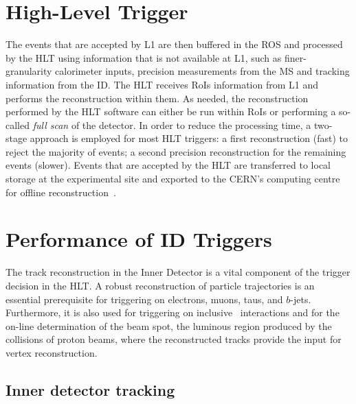 
			


	\section{High-Level Trigger}
	\label{sec:HLT}

		The events that are accepted by \ac{L1} are then buffered in the \ac{ROS} and processed by the \ac{HLT} using information that is not available at \ac{L1}, such as finer-granularity calorimeter inputs, precision measurements from the \ac{MS} and tracking information from the \ac{ID}. The \ac{HLT} receives \acp{RoI} information from \ac{L1} and performs the reconstruction within them. As needed, the reconstruction performed by the \ac{HLT} software can either be run within \ac{RoI}s or performing a so-called \emph{full scan} of the detector. In order to reduce the processing time, a two-stage approach is employed for most \ac{HLT} triggers: a first reconstruction (fast) to reject the majority of events; a second precision reconstruction for the remaining events (slower). Events that are accepted by the \ac{HLT} are transferred to local storage at the experimental site and exported to the \ac{CERN}’s computing centre for offline reconstruction~\cite{ATLASTrigger2015}. 

		\section{Performance of ID Triggers}
		\label{sec:Trig_perf}

			The track reconstruction in the Inner Detector is a vital component of the trigger decision in the \ac{HLT}. A robust reconstruction of particle trajectories is an essential prerequisite for triggering on electrons, muons, taus, and $b$-jets. Furthermore, it is also used for triggering on inclusive \pp\ interactions and for the on-line determination of the beam spot, the luminous region produced by the collisions of proton beams, where the reconstructed tracks provide the input for vertex reconstruction.

			\subsection{Inner detector tracking}
			\label{sec:tracking}

